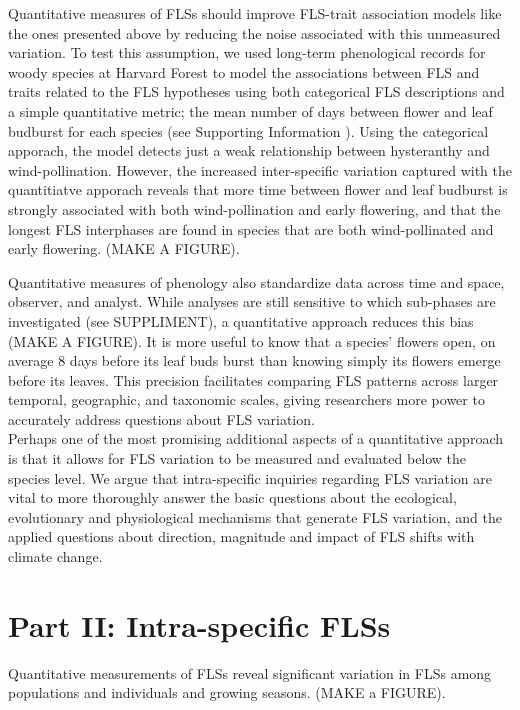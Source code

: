 \documentclass[11pt]{article}
\begin{document}
\noindent  Quantitative measures of FLSs should improve FLS-trait association models like the ones presented above by reducing the noise associated with this unmeasured variation. To test this assumption, we used long-term phenological records for woody species at Harvard Forest \citep{OKeefe2015} to model the associations between FLS and traits related to the FLS hypotheses using both categorical FLS descriptions and a simple quantitative metric; the mean number of days between flower and leaf budburst for each species (see Supporting Information ). Using the categorical apporach, the model detects just a weak relationship between hysteranthy and wind-pollination. However, the increased inter-specific variation captured with the quantitiatve apporach reveals that more time between flower and leaf budburst is strongly associated with both wind-pollination and early flowering, and that the longest FLS interphases are found in species that are both wind-pollinated and early flowering. (MAKE A FIGURE).

\noindent Quantitative measures of phenology \citep[e.g. the BBCH scale,][]{Finn2007} also standardize data across time and space, observer, and analyst. While analyses are still sensitive to which sub-phases are investigated (see SUPPLIMENT), a quantitative approach reduces this bias (MAKE A FIGURE). It is more useful to know that a species' flowers open, on average 8 days before its leaf buds burst than knowing simply its flowers emerge before its leaves. This precision facilitates comparing FLS patterns across larger temporal, geographic, and taxonomic scales, giving researchers more power to accurately address questions about FLS variation.\\

\noindent Perhaps one of the most promising additional aspects of a quantitative approach is that it allows for FLS variation to be measured and evaluated below the species level. We argue that intra-specific inquiries regarding FLS variation are vital to more thoroughly answer the basic questions about the ecological, evolutionary and physiological mechanisms that generate FLS variation, and the applied questions about direction, magnitude and impact of FLS shifts with climate change.

\section*{Part II: Intra-specific FLSs}
Quantitative measurements of FLSs reveal significant variation in FLSs among populations and individuals and growing seasons. (MAKE a FIGURE).
\end{document}
